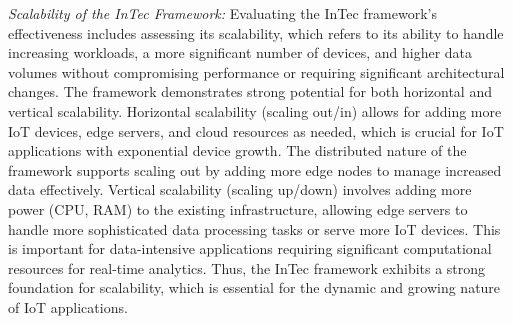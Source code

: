\documentclass[11pt]{article}
\begin{document}
	\textit{Scalability of the InTec Framework:} Evaluating the InTec framework’s effectiveness includes assessing its scalability, which refers to its ability to handle increasing workloads, a more significant number of devices, and higher data volumes without compromising performance or requiring significant architectural changes. The
	framework demonstrates strong potential for both horizontal and vertical scalability. Horizontal scalability (scaling out/in) allows for adding more IoT devices, edge
	servers, and cloud resources as needed, which is crucial for IoT applications with
	exponential device growth. The distributed nature of the framework supports scaling out by adding more edge nodes to manage increased data effectively. Vertical
	scalability (scaling up/down) involves adding more power (CPU, RAM) to the existing infrastructure, allowing edge servers to handle more sophisticated data processing tasks or serve more IoT devices. This is important for data-intensive applications requiring significant computational resources for real-time analytics. Thus, the
	InTec framework exhibits a strong foundation for scalability, which is essential for
	the dynamic and growing nature of IoT applications.
	
\end{document}
